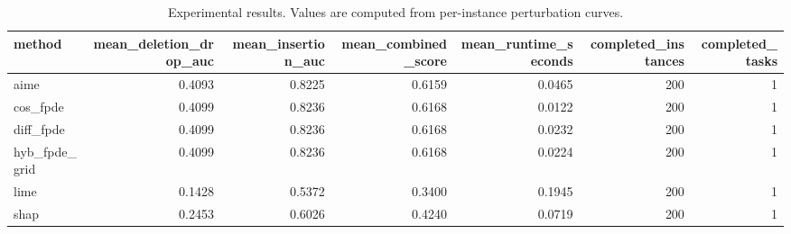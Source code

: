 \begin{table}[t]
\caption{Experimental results. Values are computed from per-instance perturbation curves.}
\label{tab:main_results_computed}
\centering
\begin{tabular}{lrrrrrr}
\toprule
method & mean\_deletion\_drop\_auc & mean\_insertion\_auc & mean\_combined\_score & mean\_runtime\_seconds & completed\_instances & completed\_tasks \\
\midrule
aime & 0.4093 & 0.8225 & 0.6159 & 0.0465 & 200 & 1 \\
cos\_fpde & 0.4099 & 0.8236 & 0.6168 & 0.0122 & 200 & 1 \\
diff\_fpde & 0.4099 & 0.8236 & 0.6168 & 0.0232 & 200 & 1 \\
hyb\_fpde\_grid & 0.4099 & 0.8236 & 0.6168 & 0.0224 & 200 & 1 \\
lime & 0.1428 & 0.5372 & 0.3400 & 0.1945 & 200 & 1 \\
shap & 0.2453 & 0.6026 & 0.4240 & 0.0719 & 200 & 1 \\
\bottomrule
\end{tabular}

\end{table}
